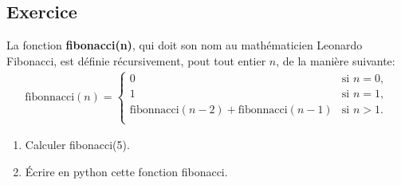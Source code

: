 \documentclass[11pt,a4paper]{article}
\newcounter{numexo}
\begin{document}
\addtocounter{numexo}{1}
\subsection*{\Large Exercice \thenumexo}
La fonction \textbf{fibonacci(n)}, qui doit son nom au mathématicien Leonardo Fibonacci, est définie récursivement, pout tout entier $n$, de la manière suivante:
\begin{align*}
\text{fibonnacci}(n)=\left\lbrace \begin{array}{ll}
0 & \text{si~} n=0,\\
1 & \text{si~} n=1,\\
\text{fibonnacci}(n-2) + \text{fibonnacci}(n-1) & \text{si~} n>1.\\
\end{array}
\right.
\end{align*}
\begin{enumerate}
\item Calculer fibonacci(5).
\item Écrire en python cette fonction fibonacci.
\end{enumerate}
\end{document}
